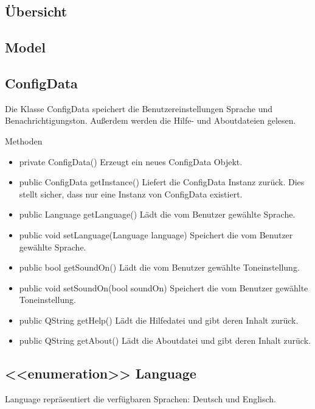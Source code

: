\subsection{Übersicht}

\subsection{Model}

\subsection{ConfigData}
Die Klasse ConfigData speichert die Benutzereinstellungen Sprache und Benachrichtigungston. Außerdem werden die Hilfe- und Aboutdateien gelesen.

Methoden
\begin{itemize}
\item private ConfigData() Erzeugt ein neues ConfigData Objekt.
\item public ConfigData getInstance() Liefert die ConfigData Instanz zurück. Dies stellt sicher, dass nur eine Instanz von ConfigData existiert.
\item public Language getLanguage() Lädt die vom Benutzer gewählte Sprache.
\item public void setLanguage(Language language) Speichert die vom Benutzer gewählte Sprache.
\item public bool getSoundOn() Lädt die vom Benutzer gewählte Toneinstellung.
\item public void setSoundOn(bool soundOn) Speichert die vom Benutzer gewählte Toneinstellung.
\item public QString getHelp() Lädt die Hilfedatei und gibt deren Inhalt zurück.
\item public QString getAbout() Lädt die Aboutdatei und gibt deren Inhalt zurück.
\end{itemize}

\subsection{<<enumeration>> Language}
Language repräsentiert die verfügbaren Sprachen: Deutsch und Englisch.

